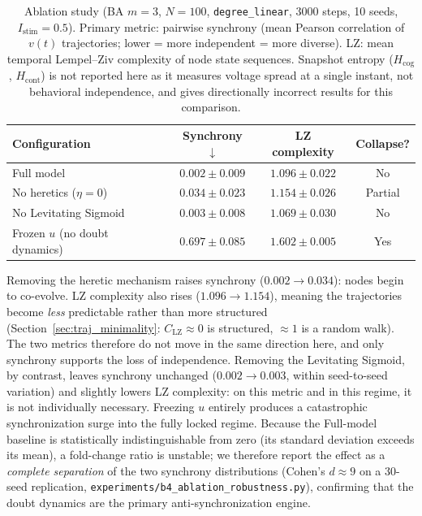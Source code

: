 ﻿\documentclass[11pt]{article}
\begin{document}
\begin{table}[ht]
\centering
\caption{Ablation study (BA $m=3$, $N=100$, \texttt{degree\_linear}, 3000 steps, 10 seeds, $I_\mathrm{stim}=0.5$). Primary metric: pairwise synchrony (mean Pearson correlation of $v(t)$ trajectories; lower = more independent = more diverse). LZ: mean temporal Lempel--Ziv complexity of node state sequences. Snapshot entropy ($H_{\mathrm{cog}}$, $H_{\mathrm{cont}}$) is not reported here as it measures voltage spread at a single instant, not behavioral independence, and gives directionally incorrect results for this comparison.}
\label{tab:ablations}
\begin{tabular}{lccc}
\toprule
\textbf{Configuration} & \textbf{Synchrony} $\downarrow$ & \textbf{LZ complexity} & \textbf{Collapse?} \\
\midrule
Full model                     & $0.002 \pm 0.009$ & $1.096 \pm 0.022$ & No \\
No heretics ($\eta = 0$)       & $0.034 \pm 0.023$ & $1.154 \pm 0.026$ & Partial \\
No Levitating Sigmoid          & $0.003 \pm 0.008$ & $1.069 \pm 0.030$ & No \\
Frozen $u$ (no doubt dynamics) & $0.697 \pm 0.085$ & $1.602 \pm 0.005$ & Yes \\
\bottomrule
\end{tabular}
\end{table}

Removing the heretic mechanism raises synchrony ($0.002 \to 0.034$): nodes begin to co-evolve. LZ complexity also rises ($1.096 \to 1.154$), meaning the trajectories become \emph{less} predictable rather than more structured (Section~\ref{sec:traj_minimality}: $C_{\text{LZ}} \approx 0$ is structured, $\approx 1$ is a random walk). The two metrics therefore do not move in the same direction here, and only synchrony supports the loss of independence. Removing the Levitating Sigmoid, by contrast, leaves synchrony unchanged ($0.002 \to 0.003$, within seed-to-seed variation) and slightly lowers LZ complexity: on this metric and in this regime, it is not individually necessary. Freezing $u$ entirely produces a catastrophic synchronization surge into the fully locked regime. Because the Full-model baseline is statistically indistinguishable from zero (its standard deviation exceeds its mean), a fold-change ratio is unstable; we therefore report the effect as a \emph{complete separation} of the two synchrony distributions (Cohen's $d \approx 9$ on a 30-seed replication, \texttt{experiments/b4\_ablation\_robustness.py}), confirming that the doubt dynamics are the primary anti-synchronization engine.
\end{document}
